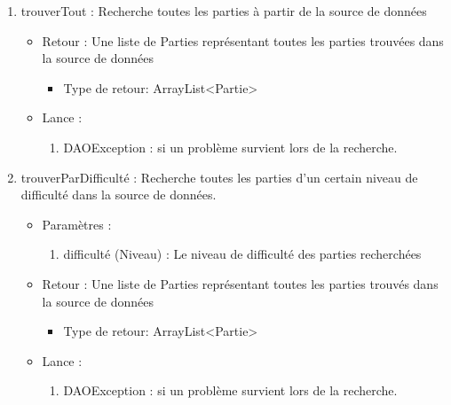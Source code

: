 \begin{itemize}
\begin{enumerate}
  \item trouverTout : Recherche toutes les parties à partir de la source de données
    \begin{itemize}
    \item Retour : Une liste de Parties représentant toutes les parties trouvées dans la source de données
      \begin{itemize}
      \item Type de retour: ArrayList<Partie>
      \end{itemize}
    \item Lance :
      \begin{enumerate}
      \item DAOException : si un problème survient lors de la recherche.
      \end{enumerate}
    \end{itemize}

  \item trouverParDifficulté : Recherche toutes les parties d'un certain niveau de difficulté dans la source de données.
    \begin{itemize}
    \item Paramètres : 
      \begin{enumerate}
      \item difficulté (Niveau) : Le niveau de difficulté des parties recherchées
      \end{enumerate}
    \item Retour : Une liste de Parties représentant toutes les parties trouvés dans la source de données
      \begin{itemize}
      \item Type de retour: ArrayList<Partie>
      \end{itemize}
    \item Lance :
      \begin{enumerate}
      \item DAOException : si un problème survient lors de la recherche.
      \end{enumerate}
    \end{itemize}


\end{enumerate}
\end{itemize}
